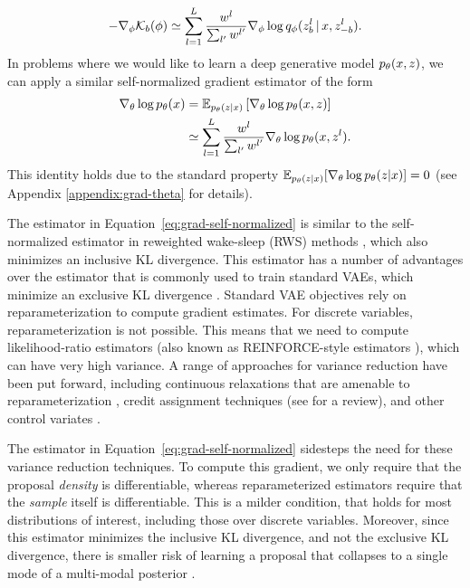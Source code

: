 \documentclass{article}
\theoremstyle{definition}
\begin{document}
\begin{align}
    \label{eq:grad-self-normalized}
    -\nabla_\phi \mathcal{K}_b(\phi)
    \simeq
    \sum_{l=1}^L
    \frac{w^l}{\sum_{l'} w^{l'}}
    \nabla_\phi
    \log q_\phi(z^l_{b} \,|\, x, z^l_{-b})
    .
\end{align}
In problems where we would like to learn a deep generative model $p_\theta(x, z)$, we can apply a similar self-normalized gradient estimator of the form
\begin{align}
    \nabla_\theta \log p_\theta(x) 
    &=
    \mathbb{E}_{p_\theta(z | x)} 
    \left[
    \nabla_\theta \log p_\theta(x, z)
    \right] \label{eq:grad-theta}\\
    &
    \simeq
    \sum_{l=1}^L
    \frac{w^l}{\sum_{l'} w^{l'}}
    \nabla_\theta
    \log p_\theta(x, z^l)
    .\nonumber
\end{align}
This identity holds due to the standard property $\mathbb{E}_{p_\theta(z|x)}[\nabla_\theta \log p_\theta(z|x)]=0$ (see Appendix \ref{appendix:grad-theta} for details). 

The estimator in Equation~\ref{eq:grad-self-normalized} is similar to the self-normalized estimator in reweighted wake-sleep (RWS) methods \cite{bornschein2014reweighted}, which also minimizes an inclusive KL divergence. This estimator has a number of advantages over the estimator that is commonly used to train standard VAEs, which minimize an exclusive KL divergence \cite{le2019revisiting}. Standard VAE objectives rely on reparameterization to compute gradient estimates. For discrete variables, reparameterization is not possible. This means that we need to compute likelihood-ratio estimators (also known as REINFORCE-style estimators \cite{williams1992simple}), which can have very high variance. A range of approaches for variance reduction have been put forward, including continuous relaxations that are amenable to reparameterization \cite{maddison2017concrete,jang2017categorical}, credit assignment techniques (see \cite{weber2019credit} for a review), and other control variates \cite{mnih2016variational,tucker2017rebar,grathwohl2018backpropagation}. 

The estimator in Equation~\ref{eq:grad-self-normalized} sidesteps the need for these variance reduction techniques. To compute this gradient, we only require that the proposal \emph{density} is differentiable, whereas reparameterized estimators require that the \emph{sample} itself is differentiable. This is a milder condition, that holds for most distributions of interest, including those over discrete variables. Moreover, since this estimator minimizes the inclusive KL divergence, and not the exclusive KL divergence, there is smaller risk of learning a proposal that collapses to a single mode of a multi-modal posterior \cite{le2019revisiting}.
\end{document}
